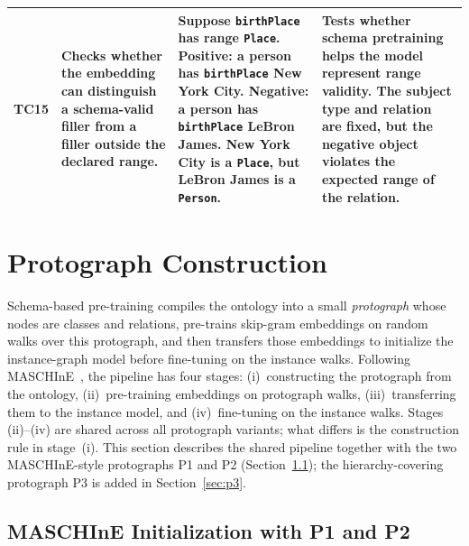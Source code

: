 \documentclass[a4paper,oneside,bibliography=totoc]{scrbook}
\begin{document}
\begin{table}[htbp]
\begin{tabularx}{\textwidth}{@{}c >{\raggedright\arraybackslash}X >{\raggedright\arraybackslash}X >{\raggedright\arraybackslash}X@{}}
      \addlinespace

      TC15 &
      Checks whether the embedding can distinguish a schema-valid filler from a filler outside the declared range. &
      Suppose \texttt{birthPlace} has range \texttt{Place}. \newline
      Positive: a person has \texttt{birthPlace} New York City. \newline
      Negative: a person has \texttt{birthPlace} LeBron James. \newline
      New York City is a \texttt{Place}, but LeBron James is a \texttt{Person}. &
      Tests whether schema pretraining helps the model represent range validity. The subject type and relation are fixed, but the negative object violates the expected range of the relation. \\

      \bottomrule
  \end{tabularx}
\end{table}

\section{Protograph Construction}
\label{sec:classic_pipeline}
\label{sec:protograph_construction}

Schema-based pre-training compiles the ontology into a small \emph{protograph}
whose nodes are classes and relations, pre-trains skip-gram embeddings on random
walks over this protograph, and then transfers those embeddings to initialize
the instance-graph model before fine-tuning on the instance walks. Following
MASCHInE~\cite{hubert2023maschine}, the
pipeline has four stages: (i)~constructing the protograph from the ontology,
(ii)~pre-training embeddings on protograph walks, (iii)~transferring them to the
instance model, and (iv)~fine-tuning on the instance walks. Stages (ii)--(iv)
are shared across all protograph variants; what differs is the construction rule
in stage~(i). This section describes the shared pipeline together with the two
MASCHInE-style protographs P1 and P2 (Section~\ref{sec:p1p2}); the
hierarchy-covering protograph P3 is added in Section~\ref{sec:p3}.

\subsection{MASCHInE Initialization with P1 and P2}
\label{sec:p1p2}
\end{document}
